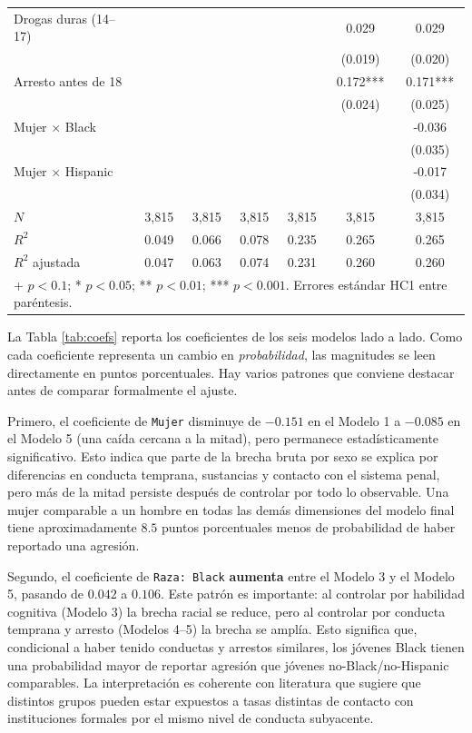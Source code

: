 \documentclass[11pt]{article}
\begin{document}
\begin{table}[H]
\begin{tabular}{lcccccc}
Drogas duras (14--17) &  &  &  &  & 0.029 & 0.029 \\
 &  &  &  &  & (0.019) & (0.020) \\
Arresto antes de 18 &  &  &  &  & 0.172*** & 0.171*** \\
 &  &  &  &  & (0.024) & (0.025) \\
Mujer $\times$ Black &  &  &  &  &  & -0.036 \\
 &  &  &  &  &  & (0.035) \\
Mujer $\times$ Hispanic &  &  &  &  &  & -0.017 \\
 &  &  &  &  &  & (0.034) \\
\midrule
$N$ & 3,815 & 3,815 & 3,815 & 3,815 & 3,815 & 3,815 \\
$R^2$ & 0.049 & 0.066 & 0.078 & 0.235 & 0.265 & 0.265 \\
$R^2$ ajustada & 0.047 & 0.063 & 0.074 & 0.231 & 0.260 & 0.260 \\
\bottomrule
\multicolumn{7}{l}{\rule{0pt}{1em}+ $p<0.1$; * $p<0.05$; ** $p<0.01$; *** $p<0.001$. Errores estándar HC1 entre paréntesis.}
\end{tabular}
\end{table}

La Tabla \ref{tab:coefs} reporta los coeficientes de los seis modelos lado a lado. Como cada coeficiente representa un cambio en \textit{probabilidad}, las magnitudes se leen directamente en puntos porcentuales. Hay varios patrones que conviene destacar antes de comparar formalmente el ajuste.

Primero, el coeficiente de \texttt{Mujer} disminuye de $-0.151$ en el Modelo 1 a $-0.085$ en el Modelo 5 (una caída cercana a la mitad), pero permanece estadísticamente significativo. Esto indica que parte de la brecha bruta por sexo se explica por diferencias en conducta temprana, sustancias y contacto con el sistema penal, pero más de la mitad persiste después de controlar por todo lo observable. Una mujer comparable a un hombre en todas las demás dimensiones del modelo final tiene aproximadamente $8.5$ puntos porcentuales menos de probabilidad de haber reportado una agresión.

Segundo, el coeficiente de \texttt{Raza: Black} \textbf{aumenta} entre el Modelo 3 y el Modelo 5, pasando de $0.042$ a $0.106$. Este patrón es importante: al controlar por habilidad cognitiva (Modelo 3) la brecha racial se reduce, pero al controlar por conducta temprana y arresto (Modelos 4--5) la brecha se amplía. Esto significa que, condicional a haber tenido conductas y arrestos similares, los jóvenes Black tienen una probabilidad mayor de reportar agresión que jóvenes no-Black/no-Hispanic comparables. La interpretación es coherente con literatura que sugiere que distintos grupos pueden estar expuestos a tasas distintas de contacto con instituciones formales por el mismo nivel de conducta subyacente.
\end{document}
